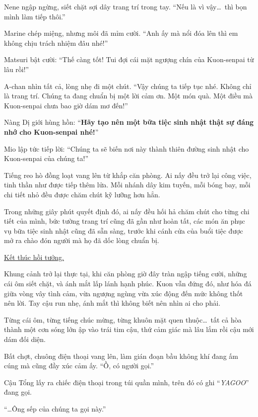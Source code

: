 \documentclass[../main.tex]{subfiles}
\begin{document}
Nene ngập ngừng, siết chặt sợi dây trang trí trong tay. ``Nếu là vì vậy\dots\ thì bọn mình làm tiếp thôi.''

Marine chép miệng, nhưng môi đã mỉm cười. ``Anh ấy mà nổi đóa lên thì em không chịu trách nhiệm đâu nhé!''

Matsuri bật cười: ``Thế càng tốt! Tui đợi cái mặt ngượng chín của Kuon-senpai từ lâu rồi!''

A-chan nhìn tất cả, lòng nhẹ đi một chút. ``Vậy chúng ta tiếp tục nhé. Không chỉ là trang trí. Chúng ta đang chuẩn bị một lời cảm ơn. Một món quà. Một điều mà Kuon-senpai chưa bao giờ dám mơ đến!''

Nàng Dị giới hùng hồn: ``\textbf{Hãy tạo nên một bữa tiệc sinh nhật thật sự đáng nhớ cho Kuon-senpai nhé!}''

Mio lập tức tiếp lời: ``Chúng ta sẽ biến nơi này thành thiên đường sinh nhật cho Kuon-senpai của chúng ta!''

Tiếng reo hò đồng loạt vang lên từ khắp căn phòng. Ai nấy đều trở lại công việc, tinh thần như được tiếp thêm lửa. Mỗi nhánh dây kim tuyến, mỗi bóng bay, mỗi chi tiết nhỏ đều được chăm chút kỹ lưỡng hơn hẳn.

Trong những giây phút quyết định đó, ai nấy đều hối hả chăm chút cho từng chi tiết của mình, bức tường trang trí cũng đã gần như hoàn tất, các món ăn phục vụ bữa tiệc sinh nhật cũng đã sẵn sàng, trước khi cánh cửa của buổi tiệc được mở ra chào đón người mà họ đã dốc lòng chuẩn bị.

\begin{center}
    \uline{Kết thúc hồi tưởng.}
\end{center}

Khung cảnh trở lại thực tại, khi căn phòng giờ đây tràn ngập tiếng cười, những cái ôm siết chặt, và ánh mắt lấp lánh hạnh phúc. Kuon vẫn đứng đó, như hóa đá giữa vòng vây tình cảm, vừa ngượng ngùng vừa xúc động đến mức không thốt nên lời. Tay cậu run nhẹ, ánh mắt thì không biết nên nhìn ai cho phải.

Từng cái ôm, từng tiếng chúc mừng, từng khuôn mặt quen thuộc\dots\ tất cả hòa thành một cơn sóng lớn ập vào trái tim cậu, thứ cảm giác mà lâu lắm rồi cậu mới dám đối diện.

Bất chợt, chuông điện thoại vang lên, làm gián đoạn bầu không khí đang ấm cúng mà cũng đầy xúc cảm ấy. ``Ồ, có người gọi.''

Cậu Tổng lấy ra chiếc điện thoại trong túi quần mình, trên đó có ghi ``\emph{YAGOO}'' đang gọi.

``\dots Ông sếp của chúng ta gọi này.''
\end{document}
